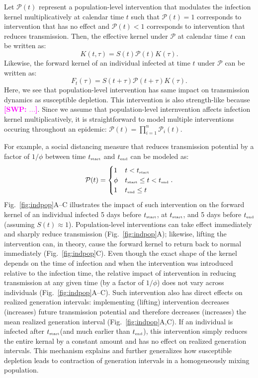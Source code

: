 \documentclass[12pt]{article}
\newcommand{\comment}{\showcomment}
\newcommand{\showcomment}[3]{\textcolor{#1}{\textbf{[#2: }\textsl{#3}\textbf{]}}}
\newcommand{\swp}[1]{\comment{magenta}{SWP}{#1}}
\newcommand{\fref}[1]{Fig.~\ref{fig:#1}}
\newcommand{\tsub}[2]{#1_{{\textrm{\tiny #2}}}}
\newcommand{\tstart}{\ensuremath{\tsub{t}{start}}\xspace}
\newcommand{\tend}{\ensuremath{\tsub{t}{end}}\xspace}
\newcommand{\PP}{{\mathcal P}}
\begin{document}
Let $\PP(t)$ represent a population-level intervention that modulates the infection kernel multiplicatively at calendar time $t$ such that $\PP(t)=1$ corresponds to intervention that has no effect and $\PP(t) < 1$ corresponds to intervention that reduces transmission.
Then, the effective kernel under $\PP$ at calendar time $t$ can be written as:
\begin{equation}
K(t, \tau) = S(t) \PP(t) K(\tau).
\end{equation}
Likewise, the forward kernel of an individual infected at time $t$ under $\PP$ can be written as:
\begin{equation}
F_t(\tau) = S(t+\tau) \PP(t + \tau) K(\tau).
\end{equation}
Here, we see that population-level intervention has same impact on transmission dynamics as susceptible depletion.
This intervention is also strength-like because \swp{...}.
Since we assume that population-level internvention affects infection kernel multiplicatively, it is straightforward to model multiple interventions occuring throughout an epidemic: $\PP(t) = \prod_{i=1}^n \PP_i(t)$.

For example, a social distancing measure that reduces transmission potential by a factor of $1/\phi$ between time \tstart and \tend can be modeled as:
\begin{equation}
\PP(t) = \begin{cases}
1 & t < \tstart\\
\phi & \tstart \leq t < \tend\\
1 & \tend \leq t
\end{cases}.
\end{equation}
\fref{indpop}A--C illustrates the impact of such intervention on the forward kernel of an individual infected 5 days before $\tstart$, at $\tstart$, and 5 days before $\tend$ (assuming $S(t) \approx 1$).
Population-level interventions can take effect immediately and sharply reduce transmission (\fref{indpop}A);
likewise, lifting the intervention can, in theory, cause the forward kernel to return back to normal immediately (\fref{indpop}C).
Even though the exact shape of the kernel depends on the time of infection and when the intervention was introduced relative to the infection time, the relative impact of intervention in reducing transmission at any given time (by a factor of $1/\phi$) does not vary across individuals (\fref{indpop}A--C).
Such intervention also has direct effects on realized generation intervals:
implementing (lifting) intervention decreases (increases) future transmission potential and therefore decreases (increases) the mean realized generation interval (\fref{indpop}A,C).
If an individual is infected after \tstart (and much earlier than \tend), this intervention simply reduces the entire kernal by a constant amount and has no effect on realized generation intervals.
This mechanism explains and further generalizes how susceptible depletion leads to contraction of generation intervals in a homogeneously mixing population. 
\end{document}
